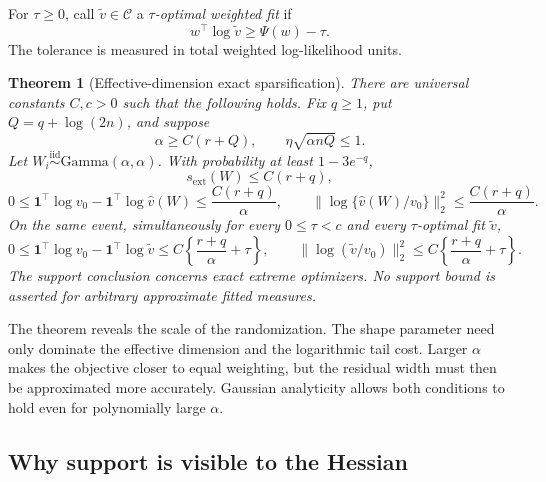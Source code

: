 \documentclass[11pt]{article}
\newtheorem{theorem}{Theorem}[section]
\theoremstyle{definition}
\theoremstyle{remark}
\newcommand{\Ccal}{\mathcal C}
\newcommand{\one}{\bm 1}
\newcommand{\norm}[1]{\lVert #1\rVert}
\newcommand{\vhat}{\widehat v}
\newcommand{\vtil}{\widetilde v}
\begin{document}
For $\tau\ge0$, call $\vtil\in\Ccal$ a \emph{$\tau$-optimal weighted fit} if
\begin{equation}\label{eq:tau-opt}
 w^\top\log\vtil\ge\Psi(w)-\tau.
\end{equation}
The tolerance is measured in total weighted log-likelihood units.

\begin{theorem}[Effective-dimension exact sparsification]
\label{thm:effective}
There are universal constants $C,c>0$ such that the following holds.  Fix
$q\ge1$, put $Q=q+\log(2n)$, and suppose
\begin{equation}\label{eq:effective-conditions}
 \alpha\ge C(r+Q),
 \qquad
 \eta\sqrt{\alpha nQ}\le1.
\end{equation}
Let $W_i\stackrel{\mathrm{iid}}\sim\mathrm{Gamma}(\alpha,\alpha)$.  With
probability at least $1-3e^{-q}$,
\begin{equation}\label{eq:effective-support}
 s_{\mathrm{ext}}(W)\le C(r+q),
\end{equation}
\begin{equation}\label{eq:effective-exact-fit}
 0\le \one^\top\log v_0-\one^\top\log\vhat(W)
 \le\frac{C(r+q)}{\alpha},
 \qquad
 \norm{\log\{\vhat(W)/v_0\}}_2^2
 \le\frac{C(r+q)}{\alpha}.
\end{equation}
On the same event, simultaneously for every $0\le\tau<c$ and every
$\tau$-optimal fit $\vtil$,
\begin{equation}\label{eq:effective-approx-fit}
 0\le \one^\top\log v_0-\one^\top\log\vtil
 \le C\left\{\frac{r+q}{\alpha}+\tau\right\},
 \qquad
 \norm{\log(\vtil/v_0)}_2^2
 \le C\left\{\frac{r+q}{\alpha}+\tau\right\}.
\end{equation}
The support conclusion concerns exact extreme optimizers.  No support bound is
asserted for arbitrary approximate fitted measures.
\end{theorem}

The theorem reveals the scale of the randomization.  The shape parameter need
only dominate the effective dimension and the logarithmic tail cost.  Larger
$\alpha$ makes the objective closer to equal weighting, but the residual
width must then be approximated more accurately.  Gaussian analyticity allows
both conditions to hold even for polynomially large $\alpha$.

\subsection{Why support is visible to the Hessian}
\end{document}
